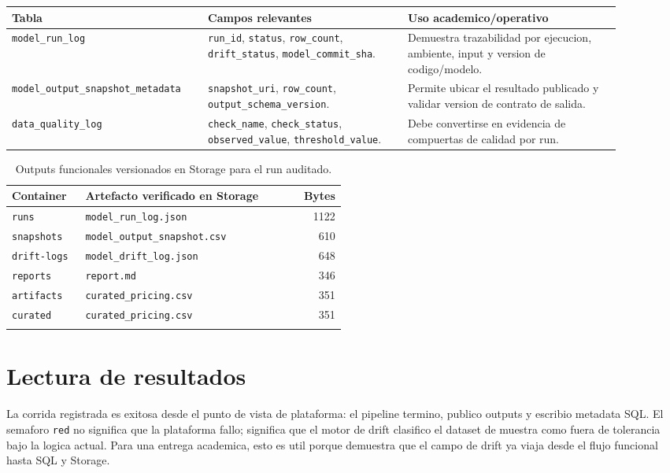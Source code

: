 \documentclass[11pt,letterpaper]{article}
\newcommand{\code}[1]{\texttt{\small #1}}
\begin{document}
\begin{longtable}{p{0.28\linewidth}p{0.30\linewidth}p{0.32\linewidth}}
\toprule
\textbf{Tabla} & \textbf{Campos relevantes} & \textbf{Uso academico/operativo}\\
\midrule
\endhead
\code{model\_run\_log} & \code{run\_id}, \code{status}, \code{row\_count}, \code{drift\_status}, \code{model\_commit\_sha}. & Demuestra trazabilidad por ejecucion, ambiente, input y version de codigo/modelo.\\
\code{model\_output\_snapshot\_metadata} & \code{snapshot\_uri}, \code{row\_count}, \code{output\_schema\_version}. & Permite ubicar el resultado publicado y validar version de contrato de salida.\\
\code{data\_quality\_log} & \code{check\_name}, \code{check\_status}, \code{observed\_value}, \code{threshold\_value}. & Debe convertirse en evidencia de compuertas de calidad por run.\\
\bottomrule
\end{longtable}

\begin{longtable}{p{0.22\linewidth}p{0.55\linewidth}r}
\toprule
\textbf{Container} & \textbf{Artefacto verificado en Storage} & \textbf{Bytes}\\
\midrule
\endhead
\code{runs} & \code{model\_run\_log.json} & 1122\\
\code{snapshots} & \code{model\_output\_snapshot.csv} & 610\\
\code{drift-logs} & \code{model\_drift\_log.json} & 648\\
\code{reports} & \code{report.md} & 346\\
\code{artifacts} & \code{curated\_pricing.csv} & 351\\
\code{curated} & \code{curated\_pricing.csv} & 351\\
\bottomrule
\caption{Outputs funcionales versionados en Storage para el run auditado.}
\end{longtable}

\section*{Lectura de resultados}

La corrida registrada es exitosa desde el punto de vista de plataforma: el pipeline termino, publico outputs y escribio metadata SQL. El semaforo \code{red} no significa que la plataforma fallo; significa que el motor de drift clasifico el dataset de muestra como fuera de tolerancia bajo la logica actual. Para una entrega academica, esto es util porque demuestra que el campo de drift ya viaja desde el flujo funcional hasta SQL y Storage.
\end{document}
